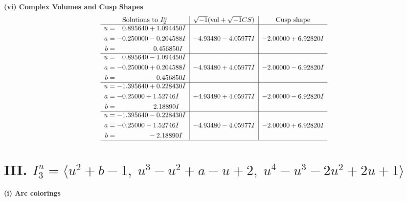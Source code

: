 \documentclass[1p]{elsarticle_modified}
\theoremstyle{definition}
\newcommand{\I}{\sqrt{-1}}
\begin{document}
\newpage\flushleft \textbf{(vi) Complex Volumes and Cusp Shapes}
$$\begin{array}{c|c|c}  
\text{Solutions to }I^u_{2}& \I (\text{vol} + \sqrt{-1}CS) & \text{Cusp shape}\\
 \hline 
\begin{aligned}
u &= \phantom{-}0.895640 + 1.094450 I \\
a &= -0.250000 - 0.204588 I \\
b &= \phantom{-0.000000 -}0.456850 I\end{aligned}
 & -4.93480 - 4.05977 I & -2.00000 + 6.92820 I \\ \hline\begin{aligned}
u &= \phantom{-}0.895640 - 1.094450 I \\
a &= -0.250000 + 0.204588 I \\
b &= \phantom{-0.000000 } -0.456850 I\end{aligned}
 & -4.93480 + 4.05977 I & -2.00000 - 6.92820 I \\ \hline\begin{aligned}
u &= -1.395640 + 0.228430 I \\
a &= -0.25000 + 1.52746 I \\
b &= \phantom{-0.000000 -}2.18890 I\end{aligned}
 & -4.93480 + 4.05977 I & -2.00000 - 6.92820 I \\ \hline\begin{aligned}
u &= -1.395640 - 0.228430 I \\
a &= -0.25000 - 1.52746 I \\
b &= \phantom{-0.000000 } -2.18890 I\end{aligned}
 & -4.93480 - 4.05977 I & -2.00000 + 6.92820 I\\
 \hline 
 \end{array}$$\newpage\newpage\renewcommand{\arraystretch}{1}
\centering \section*{III. $I^u_{3}= \langle u^2+b-1,\;u^3- u^2+a- u+2,\;u^4- u^3-2 u^2+2 u+1 \rangle$}
\flushleft \textbf{(i) Arc colorings}\\
\end{document}
